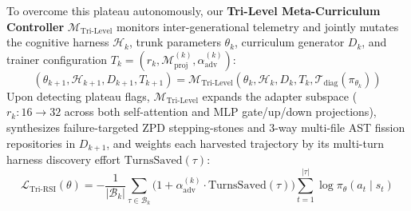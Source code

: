 \documentclass[10pt,twocolumn,letterpaper]{article}
\begin{document}
To overcome this plateau autonomously, our \textbf{Tri-Level Meta-Curriculum Controller} $\mathcal{M}_{\text{Tri-Level}}$ monitors inter-generational telemetry and jointly mutates the cognitive harness $\mathcal{H}_{k}$, trunk parameters $\theta_{k}$, curriculum generator $D_{k}$, and trainer configuration $T_{k}=(r_{k}, \mathcal{M}_{\text{proj}}^{(k)}, \alpha_{\text{adv}}^{(k)})$:
\begin{equation}
\left(\theta_{k+1}, \mathcal{H}_{k+1}, D_{k+1}, T_{k+1}\right) = \mathcal{M}_{\text{Tri-Level}}\!\left(\theta_{k}, \mathcal{H}_{k}, D_{k}, T_{k}, \mathcal{T}_{\text{diag}}(\pi_{\theta_{k}})\right)
\end{equation}
Upon detecting plateau flags, $\mathcal{M}_{\text{Tri-Level}}$ expands the adapter subspace ($r_{k}: 16\to 32$ across both self-attention and MLP gate/up/down projections), synthesizes failure-targeted ZPD stepping-stones and 3-way multi-file AST fission repositories in $D_{k+1}$, and weights each harvested trajectory by its multi-turn harness discovery effort $\text{TurnsSaved}(\tau)$:
\begin{equation}
\mathcal{L}_{\text{Tri-RSI}}(\theta) = -\frac{1}{|\mathcal{B}_{k}|}\sum_{\tau\in\mathcal{B}_{k}}\Big(1 + \alpha_{\text{adv}}^{(k)}\cdot\text{TurnsSaved}(\tau)\Big)\sum_{t=1}^{|\tau|}\log\pi_{\theta}(a_{t}\mid s_{t})
\end{equation}
\end{document}
